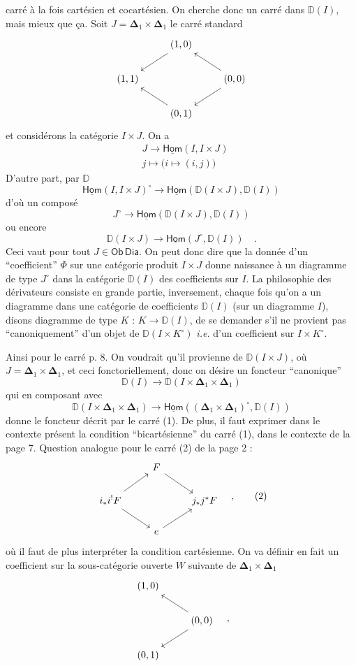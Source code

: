 \documentclass[11pt]{article}
\newcommand{\printedpage}[1]{\marginpar{\footnotesize p.~#1}}
\newcommand{\msp}[1]{\marginpar{\footnotesize [#1]}}
\newcommand{\Ob}{\mathsf{Ob}}
\newcommand{\Dia}{\mathsf{Dia}}
\newcommand{\DD}{\mathbb{D}}
\newcommand{\Hom}{\underline{\mathsf{Hom}}}
\newcommand{\Del}{\mathbf{\Delta}}
\begin{document}
carré à la fois cartésien et cocartésien. On cherche donc un carré dans $\DD(I)$, mais mieux que ça. Soit $J = \Del_1 \times \Del_1$ le carré standard
\[
\begin{tikzcd}
& (1,0) \arrow[dl] & \\
(1,1) & & (0,0) \arrow[ul] \arrow[dl] \\
& (0,1) \arrow[ul] &
\end{tikzcd}
\]
et considérons la catégorie $I \times J$. On a
\[
\begin{aligned}
& J \longrightarrow \Hom(I, I \times J) \\
& j \longmapsto \bigl(i \longmapsto (i,j)\bigr)
\end{aligned}
\]
D'autre part, par $\DD$
\[ \Hom(I, I \times J)^{\circ} \longrightarrow \Hom(\DD(I \times J), \DD(I)) \]
d'où un composé
\[ J^{\circ} \longrightarrow \Hom(\DD(I \times J), \DD(I)) \]
ou encore
\[ \DD(I \times J) \longrightarrow \Hom(J^{\circ}, \DD(I)) \quad . \]
Ceci vaut pour tout $J \in \Ob \, \Dia$. On peut donc dire que la donnée d'un “coefficient” $\Phi$ sur une catégorie produit $I \times J$ donne naissance à un diagramme de type $J^{\circ}$ dans la catégorie $\DD(I)$ des coefficients sur $I$. La philosophie
\msp{page 9}
des dérivateurs consiste en grande partie, inversement, chaque fois qu'on a un diagramme dans une catégorie de coefficients $\DD(I)$ (sur un diagramme $I$), disons diagramme de type $K$ : $K \to \DD(I)$, de se demander s'il ne provient pas “canoniquement” d'un objet de $\DD(I \times K^{\circ})$ \textit{i.e.} d'un coefficient sur $I \times K^{\circ}$.

Ainsi pour le carré p. 8. On voudrait qu'il provienne de $\DD(I \times J)$, où $J = \Del_1 \times \Del_1$, et ceci fonctoriellement, donc on désire un foncteur “canonique”
\[ \DD(I) \longrightarrow \DD(I \times \Del_1 \times \Del_1) \]
qui en composant avec
\[ \DD(I \times \Del_1 \times \Del_1) \longrightarrow \Hom((\Del_1 \times \Del_1)^{\circ}, \DD(I)) \]
\printedpage{8}
donne le foncteur décrit par le carré (1). De plus, il faut exprimer dans le contexte présent la condition “bicartésienne” du carré (1), dans le contexte de la page 7. Question analogue pour le carré (2) de la page 2 :
\[
\begin{tikzcd}
& F \arrow[dr] & \\
i_*i^!F \arrow[ur] \arrow[dr] & & j_*j^*F \\
& e \arrow[ur] &
\end{tikzcd}
\quad ,
\tag*{(2)}
\]
où il faut de plus interpréter la condition cartésienne. On va définir en fait un coefficient sur la sous-catégorie ouverte $W$ suivante de $\Del_1 \times \Del_1$
\[
\begin{tikzcd}
(1,0) & \\
& (0,0) \arrow[ul] \arrow[dl] \\
(0,1) &
\end{tikzcd}
\quad ,
\]
\end{document}
